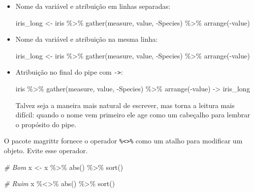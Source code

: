 \documentclass[
]{book}
\newenvironment{Shaded}{\begin{snugshade}}{\end{snugshade}}
\newcommand{\CommentTok}[1]{\textcolor[rgb]{0.56,0.35,0.01}{\textit{#1}}}
\newcommand{\FunctionTok}[1]{\textcolor[rgb]{0.00,0.00,0.00}{#1}}
\newcommand{\NormalTok}[1]{#1}
\newcommand{\OtherTok}[1]{\textcolor[rgb]{0.56,0.35,0.01}{#1}}
\newcommand{\SpecialCharTok}[1]{\textcolor[rgb]{0.00,0.00,0.00}{#1}}
\begin{document}
\begin{itemize}
\item
  Nome da variável e atribuição em linhas separadas:

\begin{Shaded}
\begin{Highlighting}[]
\NormalTok{iris\_long }\OtherTok{\textless{}{-}}
\NormalTok{  iris }\SpecialCharTok{\%\textgreater{}\%}
  \FunctionTok{gather}\NormalTok{(measure, value, }\SpecialCharTok{{-}}\NormalTok{Species) }\SpecialCharTok{\%\textgreater{}\%}
  \FunctionTok{arrange}\NormalTok{(}\SpecialCharTok{{-}}\NormalTok{value)}
\end{Highlighting}
\end{Shaded}
\item
  Nome da variável e atribuição na mesma linha:

\begin{Shaded}
\begin{Highlighting}[]
\NormalTok{iris\_long }\OtherTok{\textless{}{-}}\NormalTok{ iris }\SpecialCharTok{\%\textgreater{}\%}
  \FunctionTok{gather}\NormalTok{(measure, value, }\SpecialCharTok{{-}}\NormalTok{Species) }\SpecialCharTok{\%\textgreater{}\%}
  \FunctionTok{arrange}\NormalTok{(}\SpecialCharTok{{-}}\NormalTok{value)}
\end{Highlighting}
\end{Shaded}
\item
  Atribuição no final do pipe com \texttt{-\textgreater{}}:

\begin{Shaded}
\begin{Highlighting}[]
\NormalTok{iris }\SpecialCharTok{\%\textgreater{}\%}
  \FunctionTok{gather}\NormalTok{(measure, value, }\SpecialCharTok{{-}}\NormalTok{Species) }\SpecialCharTok{\%\textgreater{}\%}
  \FunctionTok{arrange}\NormalTok{(}\SpecialCharTok{{-}}\NormalTok{value) }\OtherTok{{-}\textgreater{}}
\NormalTok{  iris\_long}
\end{Highlighting}
\end{Shaded}

  Talvez seja a maneira mais natural de escrever, mas torna a
  leitura mais difícil: quando o nome vem primeiro ele age como um
  cabeçalho para lembrar o propósito do pipe.
\end{itemize}

O pacote magrittr fornece o operador \texttt{\%\textless{}\textgreater{}\%} como um atalho para modificar um objeto. Evite esse operador.

\begin{Shaded}
\begin{Highlighting}[]
\CommentTok{\# Bom}
\NormalTok{x }\OtherTok{\textless{}{-}}\NormalTok{ x }\SpecialCharTok{\%\textgreater{}\%} 
  \FunctionTok{abs}\NormalTok{() }\SpecialCharTok{\%\textgreater{}\%} 
  \FunctionTok{sort}\NormalTok{()}
  
\CommentTok{\# Ruim}
\NormalTok{x }\SpecialCharTok{\%\textless{}\textgreater{}\%}
  \FunctionTok{abs}\NormalTok{() }\SpecialCharTok{\%\textgreater{}\%} 
  \FunctionTok{sort}\NormalTok{()}
\end{Highlighting}
\end{Shaded}
\end{document}
